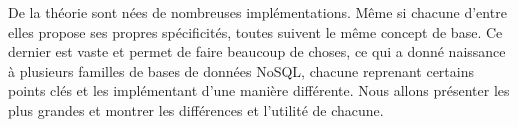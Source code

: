 De la théorie sont nées de nombreuses implémentations. Même si chacune d'entre elles propose ses propres spécificités, toutes suivent le même concept de base. Ce dernier est vaste et permet de faire beaucoup de choses, ce qui a donné naissance à plusieurs familles de bases de données NoSQL, chacune reprenant certains points clés et les implémentant d'une manière différente. Nous allons présenter les plus grandes et montrer les différences et l'utilité de chacune.
